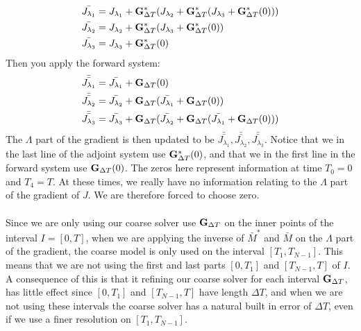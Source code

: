 \begin{align*}
\bar{J_{\lambda_1}} &=J_{\lambda_1} +\bold{G}_{\Delta T}^*(J_{\lambda_2} + \bold{G}_{\Delta T}^*(J_{\lambda_3} + \bold{G}_{\Delta T}^*(0)))\\
\bar{J_{\lambda_2}} &=J_{\lambda_2} + \bold{G}_{\Delta T}^*(J_{\lambda_3} + \bold{G}_{\Delta T}^*(0))\\
\bar{J_{\lambda_3}} &=J_{\lambda_3} + \bold{G}_{\Delta T}^*(0) \\
\end{align*} 
Then you apply the forward system:
\begin{align*}
\bar{\bar{J_{\lambda_1}}}&=\bar{J_{\lambda_1}} + \bold{G}_{\Delta T}(0) \\
\bar{\bar{J_{\lambda_2}}}&=\bar{J_{\lambda_2}}+ \bold{G}_{\Delta T}(\bar{J_{\lambda_1}} + \bold{G}_{\Delta T}(0)) \\
\bar{\bar{J_{\lambda_3}}}&=\bar{J_{\lambda_3}} + \bold{G}_{\Delta T}(\bar{J_{\lambda_2}}+ \bold{G}_{\Delta T}(\bar{J_{\lambda_1}} + \bold{G}_{\Delta T}(0)))
\end{align*} 
The $\Lambda$ part of the gradient is then updated to be $\bar{\bar{J_{\lambda_1}}}, \bar{\bar{J_{\lambda_2}}},\bar{\bar{J_{\lambda_3}}}$. Notice that we in the last line of the adjoint system use $\bold{G}_{\Delta T}^*(0)$, and that we in the first line in the forward system use $\bold{G}_{\Delta T}(0)$. The zeros here represent information at time $T_0=0$ and $T_4=T$. At these times, we really have no information relating to the $\Lambda$ part of the gradient of $J$. We are therefore forced to choose zero.
\\
\\
Since we are only using our coarse solver use $\bold{G}_{\Delta T}$ on the inner points of the interval $I=[0,T]$, when we are applying the inverse of $\bar{M}^{*}$ and $\bar{M}$ on the $\Lambda$ part of the gradient, the coarse model is only used on the interval $[T_1,T_{N-1}]$. This means that we are not using the first and last parts $[0,T_1]$ and $[T_{N-1},T]$ of $I$. A consequence of this is that it refining our coarse solver for each interval $\bold{G}_{\Delta T}$, has little effect since $[0,T_1]$ and $[T_{N-1},T]$ have length $\Delta T$, and when we are not using these intervals the coarse solver has a natural built in error of $\Delta T$, even if we use a finer resolution on $[T_1,T_{N-1}]$. 
